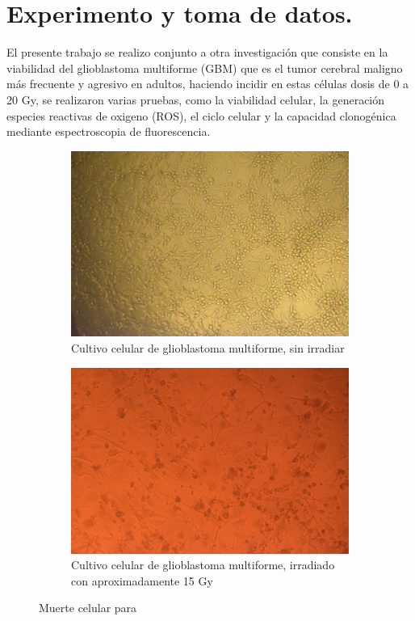 \documentclass[onecolumn,12pt]{article} %
\begin{document}
\section{Experimento y toma de datos.}
El presente trabajo  se realizo  conjunto a otra investigación que consiste en la viabilidad del glioblastoma multiforme (GBM) que es el tumor cerebral maligno más frecuente y agresivo en adultos, haciendo incidir en estas células dosis de 0 a 20 Gy, se realizaron varias pruebas, como la viabilidad celular, la generación especies reactivas  de oxigeno (ROS), el ciclo celular y la capacidad clonogénica mediante espectroscopia de fluorescencia.\cite{CIATAR A ....}


\begin{figure}[H]
    \centering
    \begin{subfigure}[b]{0.45\textwidth}
        \centering
        \includegraphics[width=\textwidth]{img_exp/pt2_ct.png}
        \caption{Cultivo celular de glioblastoma multiforme, sin irradiar}
        \label{fig:pt2_ct}
    \end{subfigure}
    \hfill
    \begin{subfigure}[b]{0.5\textwidth}
        \centering
        \includegraphics[width=\textwidth]{img_exp/pt2_15gy.png}
        \caption{Cultivo celular de glioblastoma multiforme, irradiado con aproximadamente 15 Gy}
        \label{fig:pt2_15Gy}
    \end{subfigure}
    \caption{Muerte celular para }
    \label{fig:celulas}
\end{figure}
\end{document}
